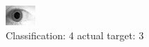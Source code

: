 \begin{figure}[h!]
\begin{center}
\includegraphics[width=0.60\columnwidth]{figures/ID1921_class_4_target_3.png}
\end{center}
\caption{ Classification: 4 actual target: 3}
\label{fig:ID1921_class_4_target_3}
\end{figure}
